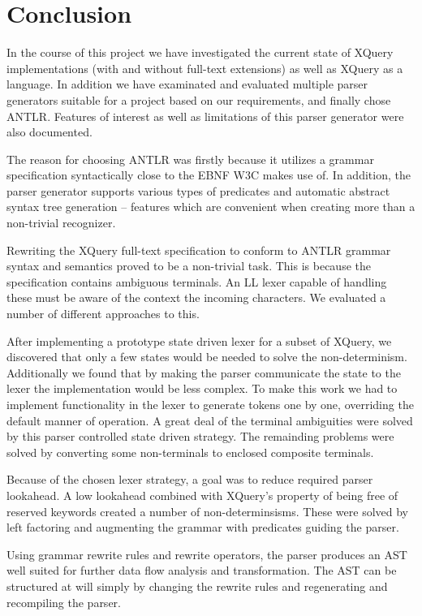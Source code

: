 \chapter{Conclusion}
\label{chapter:conclusion}

In the course of this project we have investigated the current state of XQuery
implementations (with and without full-text extensions) as well as XQuery as a
language. In addition we have examinated and evaluated multiple parser
generators suitable for a project based on our requirements, and finally chose
ANTLR. Features of interest as well as limitations of this parser generator
were also documented.

The reason for choosing ANTLR was firstly because it utilizes a grammar
specification syntactically close to the EBNF W3C makes use of. In addition,
the parser generator supports various types of predicates and automatic
abstract syntax tree generation -- features which are convenient when
creating more than a non-trivial recognizer.   

Rewriting the XQuery full-text specification to conform to ANTLR grammar syntax
and semantics proved to be a non-trivial task. This is because the
specification contains ambiguous terminals. An LL lexer capable of handling
these must be aware of the context the incoming characters. We evaluated a
number of different approaches to this.

After implementing a prototype state driven lexer for a subset of XQuery, we
discovered that only a few states would be needed to solve the non-determinism.
Additionally we found that by making the parser communicate the state to the
lexer the implementation would be less complex. To make this work we had to
implement functionality in the lexer to generate tokens one by one, overriding
the default manner of operation. A great deal of the terminal ambiguities were
solved by this parser controlled state driven strategy. The remainding problems
were solved by converting some non-terminals to enclosed composite terminals.  

Because of the chosen lexer strategy, a goal was to reduce required parser
lookahead. A low lookahead combined with XQuery's property of being free of 
reserved keywords created a number of non-determinsisms. These were solved by
left factoring and augmenting the grammar with predicates guiding the parser. 

Using grammar rewrite rules and rewrite operators, the parser produces an AST
well suited for further data flow analysis and transformation. The AST can be
structured at will simply by changing the rewrite rules and regenerating and
recompiling the parser.   

